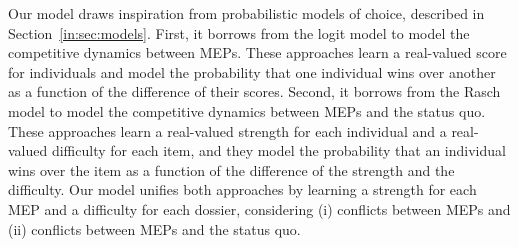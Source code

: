 Our model draws inspiration from probabilistic models of choice, described in Section~\ref{in:sec:models}.
First, it borrows from the logit model to model the competitive dynamics between MEPs.
These approaches learn a real-valued score for individuals and model the probability that one individual wins over another as a function of the difference of their scores.
Second, it borrows from the Rasch model to model the competitive dynamics between MEPs and the status quo.
These approaches learn a real-valued strength for each individual and a real-valued difficulty for each item, and they model the probability that an individual wins over the item as a function of the difference of the strength and the difficulty.
Our model unifies both approaches by learning a strength for each MEP and a difficulty for each dossier, considering (i) conflicts between MEPs and (ii) conflicts between MEPs and the status quo.
